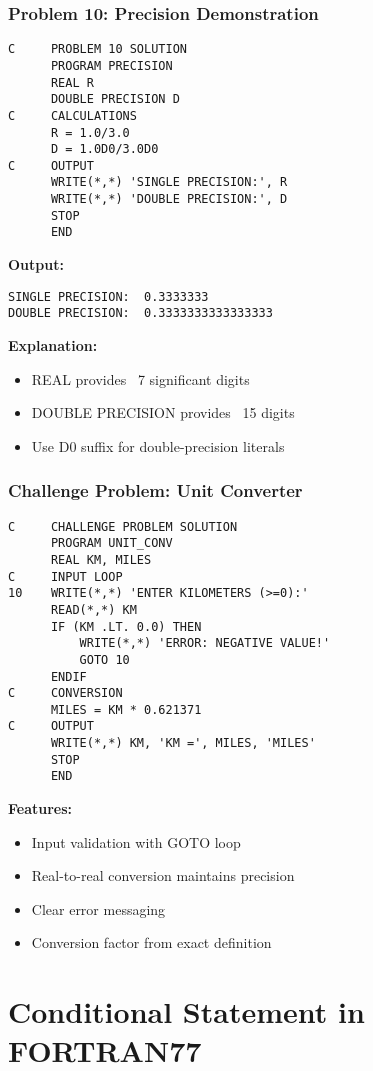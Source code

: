 \documentclass{book}
\begin{document}
\subsection*{Problem 10: Precision Demonstration}
\begin{verbatim}
C     PROBLEM 10 SOLUTION
      PROGRAM PRECISION
      REAL R
      DOUBLE PRECISION D
C     CALCULATIONS
      R = 1.0/3.0
      D = 1.0D0/3.0D0
C     OUTPUT
      WRITE(*,*) 'SINGLE PRECISION:', R
      WRITE(*,*) 'DOUBLE PRECISION:', D
      STOP
      END
\end{verbatim}
\textbf{Output:}
\begin{verbatim}
SINGLE PRECISION:  0.3333333    
DOUBLE PRECISION:  0.3333333333333333
\end{verbatim}
\textbf{Explanation:}
\begin{itemize}
    \item REAL provides ~7 significant digits
    \item DOUBLE PRECISION provides ~15 digits
    \item Use D0 suffix for double-precision literals
\end{itemize}

\subsection*{Challenge Problem: Unit Converter}
\begin{verbatim}
C     CHALLENGE PROBLEM SOLUTION
      PROGRAM UNIT_CONV
      REAL KM, MILES
C     INPUT LOOP
10    WRITE(*,*) 'ENTER KILOMETERS (>=0):'
      READ(*,*) KM
      IF (KM .LT. 0.0) THEN
          WRITE(*,*) 'ERROR: NEGATIVE VALUE!'
          GOTO 10
      ENDIF
C     CONVERSION
      MILES = KM * 0.621371
C     OUTPUT
      WRITE(*,*) KM, 'KM =', MILES, 'MILES'
      STOP
      END
\end{verbatim}
\textbf{Features:}
\begin{itemize}
    \item Input validation with GOTO loop
    \item Real-to-real conversion maintains precision
    \item Clear error messaging
    \item Conversion factor from exact definition
\end{itemize}

\chapter{Conditional Statement in FORTRAN77}
\end{document}
